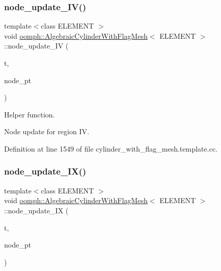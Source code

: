 \subsubsection{\texorpdfstring{node\+\_\+update\+\_\+\+I\+V()}{node\_update\_IV()}}
{\footnotesize\ttfamily template$<$class E\+L\+E\+M\+E\+NT $>$ \\
void \hyperlink{classoomph_1_1AlgebraicCylinderWithFlagMesh}{oomph\+::\+Algebraic\+Cylinder\+With\+Flag\+Mesh}$<$ E\+L\+E\+M\+E\+NT $>$\+::node\+\_\+update\+\_\+\+IV (\begin{DoxyParamCaption}\item[{const unsigned \&}]{t,  }\item[{Algebraic\+Node $\ast$\&}]{node\+\_\+pt }\end{DoxyParamCaption})\hspace{0.3cm}{\ttfamily [protected]}}



Helper function. 

Node update for region IV. 

Definition at line 1549 of file cylinder\+\_\+with\+\_\+flag\+\_\+mesh.\+template.\+cc.

\mbox{\label{classoomph_1_1AlgebraicCylinderWithFlagMesh_ae8e85400abd282b64463b67e21e9c13a}} 
\subsubsection{\texorpdfstring{node\+\_\+update\+\_\+\+I\+X()}{node\_update\_IX()}}
{\footnotesize\ttfamily template$<$class E\+L\+E\+M\+E\+NT $>$ \\
void \hyperlink{classoomph_1_1AlgebraicCylinderWithFlagMesh}{oomph\+::\+Algebraic\+Cylinder\+With\+Flag\+Mesh}$<$ E\+L\+E\+M\+E\+NT $>$\+::node\+\_\+update\+\_\+\+IX (\begin{DoxyParamCaption}\item[{const unsigned \&}]{t,  }\item[{Algebraic\+Node $\ast$\&}]{node\+\_\+pt }\end{DoxyParamCaption})\hspace{0.3cm}{\ttfamily [protected]}}



